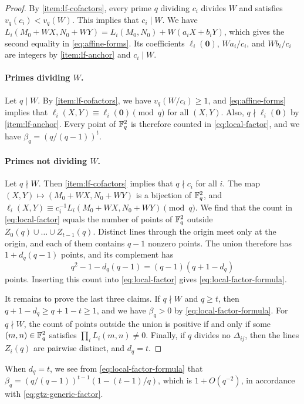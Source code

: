 \begin{proof}
By \ref{item:lf-cofactors}, every prime $q$ dividing $c_i$ divides $W$ and satisfies $v_q(c_i)<v_q(W)$. This implies that $c_i\mid W$. We have $L_i(M_0+WX,N_0+WY)=L_i(M_0,N_0)+W(a_iX+b_iY)$, which gives the second equality in \eqref{eq:affine-forms}. Its coefficients $\ell_i(\mathbf 0)$, $Wa_i/c_i$, and $Wb_i/c_i$ are integers by \ref{item:lf-anchor} and $c_i\mid W$.

\paragraph{Primes dividing $W$.} Let $q\mid W$. By \ref{item:lf-cofactors}, we have $v_q(W/c_i)\ge1$, and \eqref{eq:affine-forms} implies that $\ell_i(X,Y)\equiv\ell_i(\mathbf 0)\pmod q$ for all $(X,Y)$. Also, $q\nmid\ell_i(\mathbf 0)$ by \ref{item:lf-anchor}. Every point of $\mathbb F_q^2$ is therefore counted in \eqref{eq:local-factor}, and we have $\beta_q=(q/(q-1))^t$.

\paragraph{Primes not dividing $W$.} Let $q\nmid W$. Then \ref{item:lf-cofactors} implies that $q\nmid c_i$ for all $i$. The map $(X,Y)\mapsto(M_0+WX,N_0+WY)$ is a bijection of $\mathbb F_q^2$, and $\ell_i(X,Y)\equiv c_i^{-1}L_i(M_0+WX,N_0+WY)\pmod q$. We find that the count in \eqref{eq:local-factor} equals the number of points of $\mathbb F_q^2$ outside $Z_0(q)\cup\dots\cup Z_{t-1}(q)$. Distinct lines through the origin meet only at the origin, and each of them contains $q-1$ nonzero points. The union therefore has $1+d_q(q-1)$ points, and its complement has
\[
q^2-1-d_q(q-1)=(q-1)(q+1-d_q)
\]
points. Inserting this count into \eqref{eq:local-factor} gives \eqref{eq:local-factor-formula}.

It remains to prove the last three claims. If $q\nmid W$ and $q\ge t$, then $q+1-d_q\ge q+1-t\ge1$, and we have $\beta_q>0$ by \eqref{eq:local-factor-formula}. For $q\nmid W$, the count of points outside the union is positive if and only if some $(m,n)\in\mathbb F_q^2$ satisfies $\prod_iL_i(m,n)\ne0$. Finally, if $q$ divides no $\Delta_{ij}$, then the lines $Z_i(q)$ are pairwise distinct, and $d_q=t$.
\end{proof}

When $d_q=t$, we see from \eqref{eq:local-factor-formula} that $\beta_q=(q/(q-1))^{t-1}(1-(t-1)/q)$, which is $1+O(q^{-2})$, in accordance with \eqref{eq:gtz-generic-factor}.

